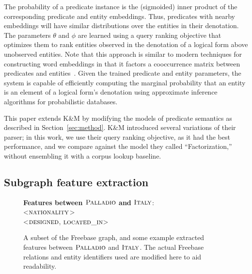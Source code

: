 \documentclass[11pt]{article}
\newcommand{\secref}[1]{Section~\ref{sec:#1}}
\newcommand{\formalpredicate}[1]{\ensuremath{\textsc{#1}}}
\newcommand{\entity}[1]{\ensuremath{\textsc{#1}}}
\begin{document}
The probability of a predicate instance is the (sigmoided) inner
product of the corresponding predicate and entity embeddings. Thus,
predicates with nearby embeddings will have similar distributions over
the entities in their denotation. The parameters $\theta$ and $\phi$
are learned using a query ranking objective that optimizes them to
rank entities observed in the denotation of a logical form above
unobserved entities. Note that this approach is similar to modern
techniques for constructing word embeddings in that it factors a
cooccurrence matrix between predicates and
entities~\cite{levy-2014-w2v-as-mf}. Given the trained predicate and
entity parameters, the system is capable of efficiently computing the
marginal probability that an entity is an element of a logical form's
denotation using approximate inference algorithms for probabilistic
databases.

This paper extends K\&M by modifying the models of predicate semantics
as described in \secref{method}. K\&M introduced several variations of
their parser; in this work, we use their query ranking objective, as
it had the best performance, and we compare against the model they
called ``Factorization,'' without ensembling it with a corpus lookup
baseline.

\subsection{Subgraph feature extraction}

\begin{figure}
  {\center
  }
  \textbf{Features between \entity{Palladio} and \entity{Italy}}:\\
  \textless\formalpredicate{nationality}\textgreater\\
  \textless\formalpredicate{designed}, \formalpredicate{located\_in}\textgreater
  \caption{A subset of the Freebase graph, and some example extracted features
  between \entity{Palladio} and \entity{Italy}.  The actual Freebase relations
  and entity identifiers used are modified here to aid readability.}
  \label{fig:sfe}
\end{figure}
\end{document}
